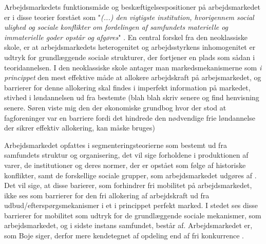 Arbejdsmarkedets funktionsmåde og beskæftigelsespositioner på arbejdsmarkedet er i disse teorier forstået som "\emph{(...) den vigtigste institution, hvorigennem social ulighed og sociale konflikter om fordelingen af samfundets materielle og immaterielle goder opstår og afgøres}" \parencite[10]{Boje1985}. 
En central forskel fra den neoklassiske skole, er at arbejdsmarkedets heterogenitet og arbejdsstyrkens inhomogenitet er udtryk for grundlæggende sociale strukturer, der fortjener en plads som sådan i teoridannelsen. I den neoklassiske skole antager man markedsmekanismerne som \emph{i princippet} den mest effektive måde at allokere arbejdskraft på arbejsmarkedet, og barrierer for denne allokering skal findes i imperfekt information på markedet, stivhed i løndannelsen ud fra bestemte (blah blah skriv senere og find henvisning senere. Søren viste mig den der økonomiske grundbog hvor der stod at fagforeninger var en barriere fordi det hindrede den nødvendige frie løndannelse der sikrer effektiv allokering, kan måske bruges)

Arbejdsmarkedet opfattes i segmenteringsteorierne som bestemt ud fra samfundets struktur og organisering, det vil sige forholdene i produktionen af varer, de institutioner og deres normer, der er opstået som følge af historiske konflikter, samt de forskellige sociale grupper, som arbejdsmarkedet udgøres af \parencite[9]{Boje1985}. Det  vil sige, at disse barierer, som forhindrer fri mobilitet på arbejdsmarkedet, ikke ses som barrierer for den fri allokering af arbejdskraft ud fra udbud/efterspørgsmekanismer i et i princippet perfekt marked. I stedet ses disse barrierer for mobilitet som udtryk for de grundlæggende sociale mekanismer, som arbejdsmarkedet, og i sidste instans samfundet, består af. Arbejdsmarkedet er, som Boje siger, derfor mere kendetegnet af opdeling end af fri konkurrence \parencite[8]{Boje1985}. 


